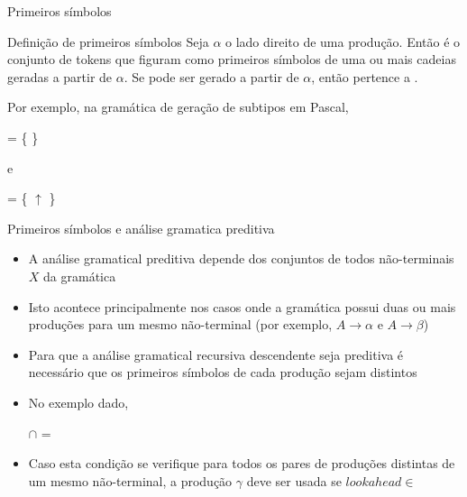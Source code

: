 \begin{frame}[fragile]{Primeiros símbolos}

    \begin{block}{Definição de primeiros símbolos}
        Seja $\alpha$ o lado direito de uma produção. Então  é o conjunto de tokens que figuram como primeiros símbolos de uma ou mais
        cadeias geradas a partir de $\alpha$. Se  pode ser gerado a partir de $\alpha$, então  pertence a .
    \end{block}

    \vspace{0.2in}
    Por exemplo, na gramática de geração de subtipos em Pascal,

    \begin{center} = \{  \}\end{center}

    e

    \begin{center} = \{ $\uparrow$ \}\end{center}

\end{frame}

\begin{frame}[fragile]{Primeiros símbolos e análise gramatica preditiva}

    \begin{itemize}
        \item A análise gramatical preditiva depende dos conjuntos  de todos não-terminais $X$ da gramática
        \pause

        \item Isto acontece principalmente nos casos onde a gramática possui duas ou mais produções para um mesmo não-terminal (por exemplo, $A \to \alpha$ e
        $A\to \beta$)
        \pause

        \item Para que a análise gramatical recursiva descendente seja preditiva é necessário que os primeiros símbolos de cada produção sejam distintos
        \pause

        \item No exemplo dado,

        \begin{center}
         $\cap$  = \emptyset
        \end{center}
        \pause

        \item Caso esta condição se verifique para todos os pares de produções distintas de um mesmo não-terminal, a produção $\gamma$ deve ser usada se
        $lookahead \in$ 
    \end{itemize}

\end{frame}


